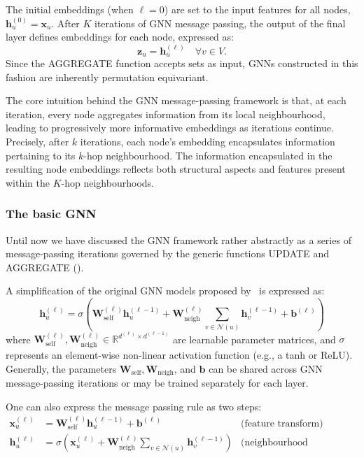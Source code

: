 The initial embeddings (when $ \ell=0 $) are set to the input features for all nodes, $ \mathbf{h}_u^{(0)} = \mathbf{x}_u $. After $ K $ iterations of GNN message passing, the output of the final layer defines embeddings for each node, expressed as:
\begin{equation*}
    \mathbf{z}_u=\mathbf{h}_u^{(\ell)} \quad \forall v \in V.
\end{equation*}
Since the AGGREGATE function accepts sets as input, GNNs constructed in this fashion are inherently permutation equivariant.

The core intuition behind the GNN message-passing framework is that, at each iteration, every node aggregates information from its local neighbourhood, leading to progressively more informative embeddings as iterations continue. Precisely, after $ k $ iterations, each node's embedding encapsulates information pertaining to its $ k $-hop neighbourhood. The information encapsulated in the resulting node embeddings reflects both structural aspects and features present within the $ K $-hop neighbourhoods.

\subsubsection{The basic GNN}
Until now we have discussed the GNN framework rather abstractly as a series of message-passing iterations governed by the generic functions UPDATE and AGGREGATE (). 

A simplification of the original GNN models proposed by~\cite{Merkwirth2005automaticGenerationComplementaryDescriptorsMolecularGraphNetworks}\cite{scarselli2008graphNeuralNetworkModel} is expressed as:
\begin{equation}\label{eq:basicGNN}
    \mathbf{h}_u^{(\ell)} = \sigma\left(\mathbf{W}_\text{self}^{(\ell)}\mathbf{h}_u^{(\ell-1)} + \mathbf{W}_\text{neigh}^{(\ell)}\sum_{v\in\mathcal{N}(u)}\mathbf{h}_v^{(\ell-1)} + \mathbf{b}^{(\ell)}\right)
\end{equation}
where $ \mathbf{W}_\text{self}^{(\ell)}, \mathbf{W}_\text{neigh}^{(\ell)} \in \mathbb{R}^{d^{(\ell)}\times d^{(\ell-1)}} $ are learnable parameter matrices, and $ \sigma $ represents an element-wise non-linear activation function (e.g., a tanh or ReLU). Generally, the parameters $ \mathbf{W}_\text{self}, \mathbf{W}_\text{neigh} $, and $\mathbf{b}$ can be shared across GNN message-passing iterations or may be trained separately for each layer. 

One can also express the message passing rule as two steps:
\begin{align}
    \mathbf{x}_u^{(\ell)} &= \mathbf{W}_\text{self}^{(\ell)}\mathbf{h}_u^{(\ell-1)} + \mathbf{b}^{(\ell)} & \text{(feature transform)}\label{eq:featureTransform} \\ 
    \mathbf{h}_u^{(\ell)} &= \sigma\left(\mathbf{x}_u^{(\ell)} + \mathbf{W}_\text{neigh}^{(\ell)} \sum_{v\in\mathcal{N}(u)}\mathbf{h}_v^{(\ell-1)}\right) & \text{(neighbourhood aggregation)} \label{eq:neighAgg}
\end{align}


